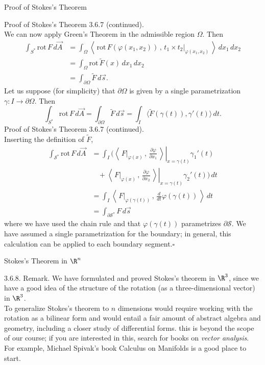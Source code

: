 \documentclass[smaller,hyperref={CJKbookmarks=true}]{beamer}
\newcommand{\scp}[2]{\left\langle\,#1\,,\,#2\,\right\rangle} \newcommand{\scpp}{\langle\,\cdot\,,\,\cdot\,\rangle}
\begin{document}
\begin{frame}{Proof of Stokes's Theorem}
\begin{spacing}{1}
\newpage
\alert{Proof of Stokes's Theorem 3.6.7 (continued).}\\
We can now apply Green's Theorem in the admissible region $\Omega$. Then
\begin{equation*}
  \begin{split}
     \int_{S^*}\text{rot}\,F\,d\vec{A} &=\int_\Omega\scp{\text{rot}\,F(\varphi(x_1,x_2))}{t_1\times t_2|_{\varphi(x_1,x_2)}}\,dx_1\,dx_2 \\
       &=\int_\Omega\text{rot}\,\widetilde{F}(x)\,dx_1\,dx_2 \\
       &=\int_{\partial\Omega}\widetilde{F}\,d\vec{s}.
  \end{split}
\end{equation*}
Let us suppose (for simplicity) that $\partial\Omega$ is given by a single parametrization $\gamma:I\to\partial\Omega$. Then
\[\int_{S^*}\text{rot}\,F\,d\vec{A}=\int_{\partial\Omega}\widetilde{F}\,d\vec{s}
=\int_I\langle\widetilde{F}(\gamma(t)),\gamma'(t)\rangle\,dt.\]
\newpage
\alert{Proof of Stokes's Theorem 3.6.7 (continued).}\\
Inserting the definition of $\widetilde{F}$,
\begin{equation*}
  \begin{split}
     \int_{\mathcal{S}^*}\text{rot}\,F\,d\vec{A} &=\int_I\bigg(\left.\scp{F|_{\varphi(x)}}{\frac{\partial\varphi}{\partial x_1}}\right|_{x=\gamma(t)}\gamma_1'(t) \\
       &~~~~+\left.\scp{F|_{\varphi(x)}}{\frac{\partial\varphi}{\partial x_2}}\right|_{x=\gamma(t)}\gamma_2'(t)\bigg)\,dt \\
       &=\int_I\scp{F|_{\varphi(\gamma(t))}}{\frac{d}{dt}\varphi(\gamma(t))}\,dt \\
       &=\int_{\partial\mathcal{S}^*}F\,d\vec{s}
  \end{split}
\end{equation*}
where we have used the chain rule and that $\varphi(\gamma(t))$ parametrizes $\partial\mathcal{S}$. We
have assumed a single parametrization for the boundary; in general, this
calculation can be applied to each boundary segment.\quad$\square$
\end{spacing}
\end{frame}
\begin{frame}[c]{Stokes's Theorem in $\R^n$}
\begin{spacing}{1.1}
\alert{3.6.8. Remark.} We have formulated and proved Stokes's theorem in $\R^3$,
since we have a good idea of the structure of the rotation (as a
three-dimensional vector) in $\R^3$.\\[5pt]
To generalize Stokes's theorem to $n$ dimensions would require working
with the rotation as a bilinear form and would entail a fair amount of
abstract algebra and geometry, including a closer study of dif{}ferential
forms. this is beyond the scope of our course; if you are interested in this,
search for books on \emph{vector analysis}.\\[5pt]
For example, Michael Spivak's book Calculus on Manifolds is a good place
to start.
\end{spacing}
\end{frame}
\end{document}
